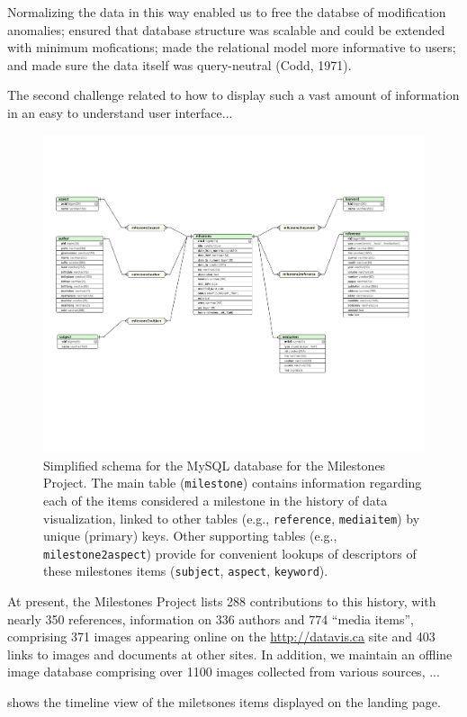 Normalizing the data in this way enabled us to free the databse of modification anomalies; ensured that database 
structure was scalable and could be extended with minimum mofications; made the relational model more informative 
to users; and made sure the data itself was query-neutral (Codd, 1971).

The second challenge related to how to display such a vast amount of information in an easy to understand
user interface...



\begin{figure}[!htb]
  \centering
  \includegraphics[width=\textwidth,clip]{fig/datavis-schema-2}
  \caption{Simplified schema for the MySQL database for the Milestones Project. The main 
  table (\texttt{milestone}) contains information regarding each of the items considered
  a milestone in the history of data visualization, linked to other tables 
  (e.g., \texttt{reference}, \texttt{mediaitem}) by unique (primary) keys.
  Other supporting tables (e.g., \texttt{milestone2aspect}) provide for convenient lookups of 
  descriptors of these milestones items (\texttt{subject}, \texttt{aspect}, \texttt{keyword}).
  }
  \label{fig:datavis-schema-2}
\end{figure}


At present, the Milestones Project lists 288 contributions to this history, with nearly 350 references,
information on 336 authors and 774 ``media items'', comprising 371 images appearing online on the
\url{http://datavis.ca} site and 403 links to images and documents at other sites.
In addition, we maintain an offline image database comprising over 1100 images collected from
various sources, ...

 shows the timeline view of the miletsones items displayed on the
landing page. 

